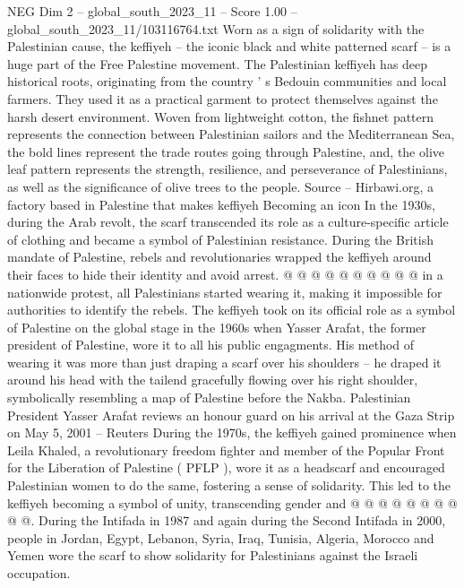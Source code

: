 \begin{textsample}{NEG Dim 2 – global\_south\_2023\_11 – Score 1.00 – global\_south\_2023\_11/103116764.txt}  \label{ex:f2_neg_350}
Worn as a sign of solidarity with the Palestinian cause, the keffiyeh -- the iconic black and white patterned scarf -- is a huge part of the Free Palestine movement.
The Palestinian keffiyeh has deep historical roots, originating from the country ' s Bedouin communities and local farmers.
They used it as a practical garment to protect themselves against the harsh desert environment.
Woven from lightweight cotton, the fishnet pattern represents the connection between Palestinian sailors and the Mediterranean Sea, the bold lines represent the trade routes going through Palestine, and, the olive leaf pattern represents the strength, resilience, and perseverance of Palestinians, as well as the significance of olive trees to the people.
Source -- Hirbawi.org, a factory based in Palestine that makes keffiyeh Becoming an icon In the 1930s, during the Arab revolt, the scarf transcended its role as a culture-specific article of clothing and became a symbol of Palestinian resistance.
During the British mandate of Palestine, rebels and revolutionaries wrapped the keffiyeh around their faces to hide their identity and avoid arrest. @ @ @ @ @ @ @ @ @ @ in a nationwide protest, all Palestinians started wearing it, making it impossible for authorities to identify the rebels.
The keffiyeh took on its official role as a symbol of Palestine on the global stage in the 1960s when Yasser Arafat, the former president of Palestine, wore it to all his public engagments.
His method of wearing it was more than just draping a scarf over his shoulders -- he draped it around his head with the tailend gracefully flowing over his right shoulder, symbolically resembling a map of Palestine before the Nakba.
Palestinian President Yasser Arafat reviews an honour guard on his arrival at the Gaza Strip on May 5, 2001 -- Reuters During the 1970s, the keffiyeh gained prominence when Leila Khaled, a revolutionary freedom fighter and member of the Popular Front for the Liberation of Palestine ( PFLP ), wore it as a headscarf and encouraged Palestinian women to do the same, fostering a sense of solidarity.
This led to the keffiyeh becoming a symbol of unity, transcending gender and @ @ @ @ @ @ @ @ @ @.
During the Intifada in 1987 and again during the Second Intifada in 2000, people in Jordan, Egypt, Lebanon, Syria, Iraq, Tunisia, Algeria, Morocco and Yemen wore the scarf to show solidarity for Palestinians against the Israeli occupation.

\end{textsample}
